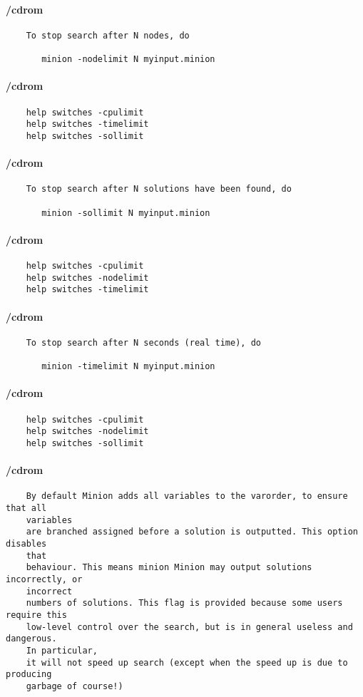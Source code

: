 \paragraph{/cdrom}
{\footnotesize
\begin{verbatim}
    To stop search after N nodes, do

       minion -nodelimit N myinput.minion
\end{verbatim}
}
\paragraph{/cdrom}
{\footnotesize
\begin{verbatim}
    help switches -cpulimit
    help switches -timelimit
    help switches -sollimit
\end{verbatim}
}
\paragraph{/cdrom}
{\footnotesize
\begin{verbatim}
    To stop search after N solutions have been found, do

       minion -sollimit N myinput.minion
\end{verbatim}
}
\paragraph{/cdrom}
{\footnotesize
\begin{verbatim}
    help switches -cpulimit
    help switches -nodelimit
    help switches -timelimit
\end{verbatim}
}
\paragraph{/cdrom}
{\footnotesize
\begin{verbatim}
    To stop search after N seconds (real time), do

       minion -timelimit N myinput.minion
\end{verbatim}
}
\paragraph{/cdrom}
{\footnotesize
\begin{verbatim}
    help switches -cpulimit
    help switches -nodelimit
    help switches -sollimit
\end{verbatim}
}
\paragraph{/cdrom}
{\footnotesize
\begin{verbatim}
    By default Minion adds all variables to the varorder, to ensure that all
    variables
    are branched assigned before a solution is outputted. This option disables
    that
    behaviour. This means minion Minion may output solutions incorrectly, or
    incorrect
    numbers of solutions. This flag is provided because some users require this
    low-level control over the search, but is in general useless and dangerous.
    In particular,
    it will not speed up search (except when the speed up is due to producing
    garbage of course!)
\end{verbatim}
}

